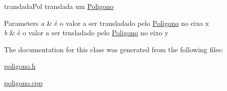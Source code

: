 translada\+Pol translada um \hyperlink{class_poligono}{Poligono} 


\begin{DoxyParams}{Parameters}
{\em a} & é o valor a ser transladado pelo \hyperlink{class_poligono}{Poligono} no eixo x \\
\hline
{\em b} & é o valor a ser trnsladado pelo \hyperlink{class_poligono}{Poligono} no eixo y \\
\hline
\end{DoxyParams}


The documentation for this class was generated from the following files\+:\begin{DoxyCompactItemize}
\item 
\hyperlink{poligono_8h}{poligono.\+h}\item 
\hyperlink{poligono_8cpp}{poligono.\+cpp}\end{DoxyCompactItemize}
